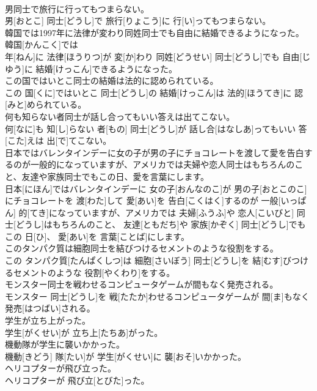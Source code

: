 \documentclass[8pt]{extreport}
\begin{document}
\begin{CJK}{UTF8}{min}
\\	男同士で旅行に行ってもつまらない。	
\\	男[おとこ] 同士[どうし]で 旅行[りょこう]に 行[い]ってもつまらない。
\\	韓国では1997年に法律が変わり同姓同士でも自由に結婚できるようになった。	
\\	韓国[かんこく]では 
\\	年[ねん]に 法律[ほうりつ]が 変[か]わり 同姓[どうせい] 同士[どうし]でも 自由[じゆう]に 結婚[けっこん]できるようになった。
\\	この国ではいとこ同士の結婚は法的に認められている。	
\\	この 国[くに]ではいとこ 同士[どうし]の 結婚[けっこん]は 法的[ほうてき]に 認[みと]められている。
\\	何も知らない者同士が話し合ってもいい答えは出てこない。	
\\	何[なに]も 知[し]らない 者[もの] 同士[どうし]が 話し合[はなしあ]ってもいい 答[こた]えは 出[で]てこない。
\\	日本ではバレンタインデーに女の子が男の子にチョコレートを渡して愛を告白するのが一般的になっていますが、アメリカでは夫婦や恋人同士はもちろんのこと、友達や家族同士でもこの日、愛を言葉にします。	
\\	日本[にほん]ではバレンタインデーに 女の子[おんなのこ]が 男の子[おとこのこ]にチョコレートを 渡[わた]して 愛[あい]を 告白[こくはく]するのが 一般[いっぱん] 的[てき]になっていますが、アメリカでは 夫婦[ふうふ]や 恋人[こいびと] 同士[どうし]はもちろんのこと、 友達[ともだち]や 家族[かぞく] 同士[どうし]でもこの 日[ひ]、 愛[あい]を 言葉[ことば]にします。
\\	このタンパク質は細胞同士を結びつけるセメントのような役割をする。	
\\	この タンパク質[たんぱくしつ]は 細胞[さいぼう] 同士[どうし]を 結[むす]びつけるセメントのような 役割[やくわり]をする。
\\	モンスター同士を戦わせるコンピュータゲームが間もなく発売される。	
\\	モンスター 同士[どうし]を 戦[たたか]わせるコンピュータゲームが 間[ま]もなく 発売[はつばい]される。
\\	学生が立ち上がった。	
\\	学生[がくせい]が 立ち上[たちあ]がった。
\\	機動隊が学生に襲いかかった。	
\\	機動[きどう] 隊[たい]が 学生[がくせい]に 襲[おそ]いかかった。
\\	ヘリコプターが飛び立った。	
\\	ヘリコプターが 飛び立[とびた]った。

\end{CJK}
\end{document}
